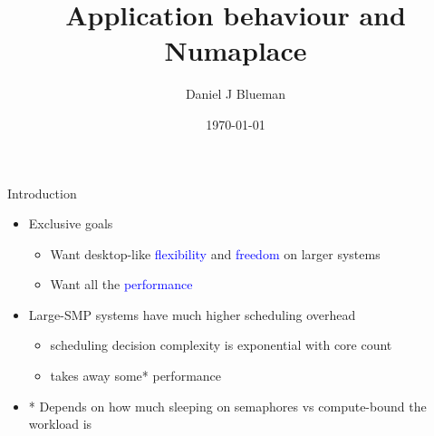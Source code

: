 \documentclass{beamer}
\begin{document}
\title{Application behaviour and Numaplace}
\author{Daniel J Blueman}
\date{\today}

\begin{frame}[plain]
  \titlepage
\end{frame}

\begin{frame}{Introduction}
\begin{itemize}
\item Exclusive goals
	\begin{itemize}
	\item Want desktop-like \textcolor{blue}{flexibility} and \textcolor{blue}{freedom} on larger systems
	\item Want all the \textcolor{blue}{performance}
	\end{itemize}

\vspace{6pt}

\item Large-SMP systems have much higher scheduling overhead
	\begin{itemize}
	\item scheduling decision complexity is exponential with core count
	\item takes away some* performance
	\end{itemize}

\vspace{6pt}

\item * Depends on how much sleeping on semaphores vs compute-bound the workload is
\end{itemize}
\end{frame}
\end{document}
